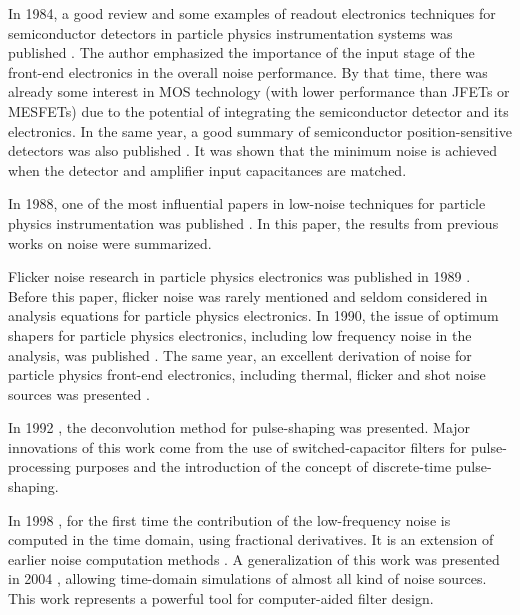 In 1984, a good review and some examples of readout electronics techniques for semiconductor detectors in particle physics instrumentation systems was published \citep{gatti103}. The author emphasized the importance of the input stage of the front-end electronics in the overall noise performance. By that time, there was already some interest in MOS technology (with lower performance than JFETs or MESFETs) due to the potential of integrating the semiconductor detector and its electronics. In the same year, a good summary of semiconductor position-sensitive detectors was also published \citep{radeka105}. It was shown that the minimum noise is achieved when the detector and amplifier input capacitances are matched.

In 1988, one of the most influential papers in low-noise techniques for particle physics instrumentation was published \citep{radeka101}. In this paper, the results from previous works on noise were summarized.

Flicker noise research in particle physics electronics was published in 1989 \citep{lutz101}. Before this paper, flicker noise was rarely mentioned and seldom considered in analysis equations for particle physics electronics. In 1990, the issue of optimum shapers for particle physics electronics, including low frequency noise in the analysis, was published \citep{gatti104}. The same year, an excellent derivation of noise for particle physics front-end electronics, including thermal, flicker and shot noise sources was presented \citep{sansen101}.

In 1992 \citep{gadomski101}, the deconvolution method for pulse-shaping was presented. Major innovations of this work come from the use of switched-capacitor filters for \mbox{pulse-processing} purposes and the introduction of the concept of \mbox{discrete-time} \mbox{pulse-shaping}.

In 1998 \citep{pullia104}, for the first time the contribution of the low-frequency noise is computed in the time domain, using fractional derivatives. It is an extension of earlier noise computation methods \citep{goulding101}. A generalization of this work was presented in 2004 \citep{pullia102}, allowing time-domain simulations of almost all kind of noise sources.  This work represents a powerful tool for computer-aided filter design.




